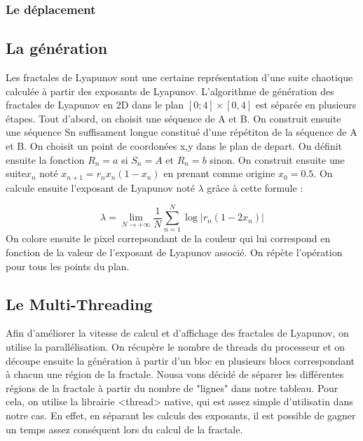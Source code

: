 \documentclass{article}
\begin{document}
    \subsubsection*{Le déplacement}

    \subsection*{La génération}
Les fractales de Lyapunov sont une certaine représentation d'une suite chaotique calculée à partir des exposants de Lyapunov.
 L'algorithme de génération des fractales de Lyapunov en 2D dans le plan $[0;4] \times [0,4]$ est séparée en plusieurs étapes. Tout d'abord, on choisit une séquence de A et B.
 On construit ensuite une séquence Sn suffisament longue constitué d'une répétiton de la séquence de A et B.
 On choisit un point de coordonées x,y dans le plan de depart.
 On définit ensuite la fonction $R_n = a$ si $ S_n = A $ et $R_n = b$ sinon.
On construit ensuite une suite$x_n$ noté $x_{{n+1}}=r_{n}x_{n}(1-x_{n})$ en prenant comme origine $x_0 = 0.5$.
On calcule ensuite l'exposant de Lyapunov noté $\lambda$ grâce à cette formule :

$$
\lambda = \lim_{N \to +\infty} \frac{1}{N} \sum_{n=1}^{N} \log | r_n(1-2x_n) |
$$
On colore ensuite le pixel correpsondant de la couleur qui lui correspond en fonction de la valeur de l'exposant de Lyapunov associé.
On répète l'opération pour tous les points du plan.

\subsection*{Le Multi-Threading}
Afin d'améliorer la vitesse de calcul et d'affichage des fractales de Lyapunov, on utilise la parallélisation. On récupère le nombre de threads du processeur et on découpe ensuite la génération à partir d'un bloc en plusieurs blocs correspondant à chacun une région de la fractale.
Nousa vons décidé de séparer les différentes régions de la fractale à partir du nombre de "lignes" dans notre tableau.
 Pour cela, on utilise la librairie <thread> native, qui est assez simple d'utilisatin dans notre cas.
En effet, en séparant les calculs des exposants, il est possible de gagner un temps assez conséquent lors du calcul de la fractale. 
\end{document}
